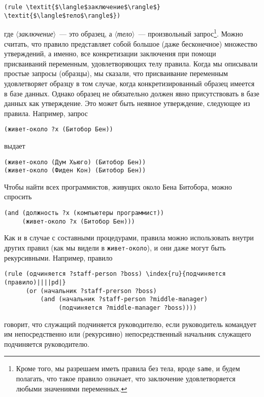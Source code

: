 \begin{Verbatim}[fontsize=\small]
(rule \textit{$\langle$заключение$\rangle$} \textit{$\langle$тело$\rangle$})
\end{Verbatim}
где \textit{$\langle$заключение$\rangle$}~--- это образец, а
\textit{$\langle$тело$\rangle$}~--- произвольный 
запрос\footnote{Кроме того, мы разрешаем иметь правила без тела,
вроде {\tt same}, и будем полагать, что такое правило означает,
что заключение удовлетворяется любыми значениями переменных.}.
Можно
считать, что правило представляет собой большое (даже бесконечное)
множество утверждений, а именно, все конкретизации заключения при
помощи присваиваний переменным, удовлетворяющих телу правила.
Когда мы описывали простые запросы (образцы), мы сказали, что
присваивание переменным удовлетворяет образцу в том случае, когда
конкретизированный образец имеется в базе данных.  Однако образец не
обязательно должен явно присутствовать в базе данных как утверждение.
Это может быть неявное утверждение, 
следующее из правила.  Например, запрос

\begin{Verbatim}[fontsize=\small]
(живет-около ?x (Битобор Бен))
\end{Verbatim}
выдает

\begin{Verbatim}[fontsize=\small]
(живет-около (Дум Хьюго) (Битобор Бен))
(живет-около (Фиден Кон) (Битобор Бен))
\end{Verbatim}
Чтобы найти всех программистов, живущих около Бена Битобора,
можно спросить

\begin{Verbatim}[fontsize=\small]
(and (должность ?x (компьютеры программист))
     (живет-около ?x (Битобор Бен)))
\end{Verbatim}

Как и в случае с составными 
процедурами, правила
можно использовать внутри других правил (как мы видели в
{\tt живет-около}),  и они даже могут быть рекурсивными.  Например,
правило

\begin{Verbatim}[fontsize=\small]
(rule (одчиняется ?staff-person ?boss) \index{ru}{подчиняется (правило)||||pd|}
      (or (начальник ?staff-prerson ?boss)
          (and (начальник ?staff-person ?middle-manager)
               (подчиняется ?middle-manager ?boss))))
\end{Verbatim}
говорит, что служащий подчиняется руководителю, если руководитель командует
им непосредственно или (рекурсивно) непосредственный начальник
служащего подчиняется руководителю.


